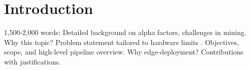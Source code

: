 \section{Introduction}
\label{sec:intro}

1,500-2,000 words: Detailed background on alpha factors, challenges in mining. Why this topic? Problem statement tailored to hardware limits . Objectives, scope, and high-level pipeline overview. Why edge-deployment?  Contributions with justifications.